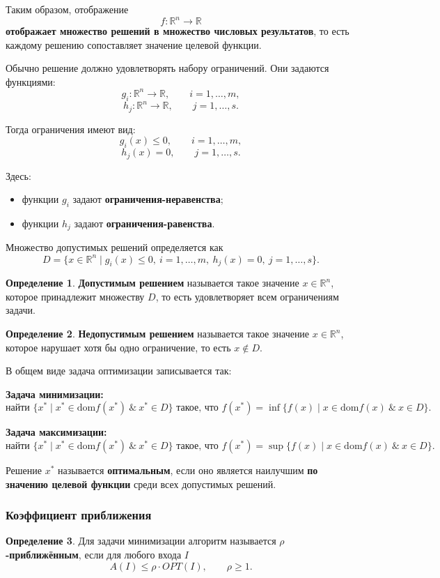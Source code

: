 \documentclass[12pt,a4paper]{article}
\theoremstyle{definition}
\newtheorem{definition}{Определение}[section]
\theoremstyle{plain}
\begin{document}
Таким образом, отображение
\[
f:\mathbb{R}^n\to\mathbb{R}
\]
\textbf{отображает множество решений в множество числовых результатов}, то есть каждому решению сопоставляет значение целевой функции.

Обычно решение должно удовлетворять набору ограничений. Они задаются функциями:
\[
g_i:\mathbb{R}^n\to\mathbb{R}, \qquad i=1,\dots,m,
\]
\[
h_j:\mathbb{R}^n\to\mathbb{R}, \qquad j=1,\dots,s.
\]

Тогда ограничения имеют вид:
\[
g_i(x)\le 0,\qquad i=1,\dots,m,
\]
\[
h_j(x)=0,\qquad j=1,\dots,s.
\]

Здесь:
\begin{itemize}
\item функции $g_i$ задают \textbf{ограничения-неравенства};
\item функции $h_j$ задают \textbf{ограничения-равенства}.
\end{itemize}

Множество допустимых решений определяется как
\[
D=\{x\in \mathbb{R}^n \mid g_i(x)\le 0,\ i=1,\dots,m,\ h_j(x)=0,\ j=1,\dots,s\}.
\]

\begin{definition}
\textbf{Допустимым решением} называется такое значение $x\in \mathbb{R}^n$, которое принадлежит множеству $D$, то есть удовлетворяет всем ограничениям задачи.
\end{definition}

\begin{definition}
\textbf{Недопустимым решением} называется такое значение $x\in \mathbb{R}^n$, которое нарушает хотя бы одно ограничение, то есть $x\notin D$.
\end{definition}

В общем виде задача оптимизации записывается так:

\medskip
\noindent
\textbf{Задача минимизации:}
\[
\text{найти } \{x^* \mid x^* \in \text{dom}f(x^*)\ \&\ x^* \in D\} \text{ такое, что } f(x^*) = \inf \{ f(x) \mid x \in \text{dom}f(x)\ \&\ x\in D \}.
\]

\noindent
\textbf{Задача максимизации:}
\[
\text{найти } \{ x^* \mid x^* \in \text{dom}f(x^*)\ \&\ x^* \in D\} \text{ такое, что } f(x^*) = \sup \{ f(x) \mid x \in \text{dom}f(x)\ \&\ x\in D \}.
\]

Решение $x^*$ называется \textbf{оптимальным}, если оно является наилучшим \textbf{по значению целевой функции} среди всех допустимых решений.

\subsubsection{Коэффициент приближения}
\begin{definition}
Для задачи минимизации алгоритм называется \textbf{$\rho$-приближённым}, если для любого входа $I$
\[
A(I)\le \rho\cdot OPT(I), \qquad \rho\ge 1.
\]
\end{definition}
\end{document}
